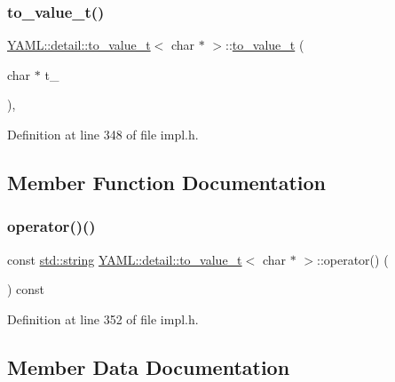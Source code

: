 \subsubsection{\texorpdfstring{to\_value\_t()}{to\_value\_t()}}
{\footnotesize\ttfamily \mbox{\hyperlink{struct_y_a_m_l_1_1detail_1_1to__value__t}{Y\+A\+M\+L\+::detail\+::to\+\_\+value\+\_\+t}}$<$ char $\ast$ $>$\+::\mbox{\hyperlink{struct_y_a_m_l_1_1detail_1_1to__value__t}{to\+\_\+value\+\_\+t}} (\begin{DoxyParamCaption}\item[{char $\ast$}]{t\+\_\+ }\end{DoxyParamCaption})\hspace{0.3cm}{\ttfamily [inline]}, {\ttfamily [explicit]}}



Definition at line 348 of file impl.\+h.



\subsection{Member Function Documentation}
\mbox{\label{struct_y_a_m_l_1_1detail_1_1to__value__t_3_01char_01_5_01_4_a9b2606c8624eb1476cea7d8892aa148a}} 
\subsubsection{\texorpdfstring{operator()()}{operator()()}}
{\footnotesize\ttfamily const \mbox{\hyperlink{glad_8h_ac83513893df92266f79a515488701770}{std\+::string}} \mbox{\hyperlink{struct_y_a_m_l_1_1detail_1_1to__value__t}{Y\+A\+M\+L\+::detail\+::to\+\_\+value\+\_\+t}}$<$ char $\ast$ $>$\+::operator() (\begin{DoxyParamCaption}{ }\end{DoxyParamCaption}) const\hspace{0.3cm}{\ttfamily [inline]}}



Definition at line 352 of file impl.\+h.



\subsection{Member Data Documentation}
\mbox{\label{struct_y_a_m_l_1_1detail_1_1to__value__t_3_01char_01_5_01_4_ab8bc9dca5f7e77303f6750292d34cb4d}} 
